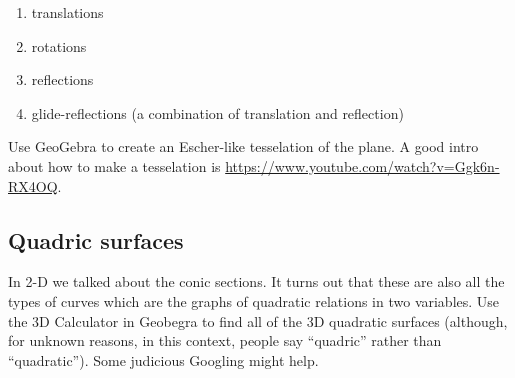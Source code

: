 \begin{enumerate} 
	\item translations
	\item rotations
	\item reflections
	\item glide-reflections (a combination of translation and reflection)
\end{enumerate}

Use GeoGebra to create an Escher-like tesselation of the plane.  A good intro about how to make a tesselation is \url{https://www.youtube.com/watch?v=Ggk6n-RX4OQ}.

\subsection{Quadric surfaces}

In 2-D we talked about the conic sections.  It turns out that these are also all the types of curves which are the graphs of quadratic relations in two variables.
Use the 3D Calculator in Geobegra to find all of the 3D quadratic surfaces (although, for unknown reasons, in this context, people say ``quadric'' rather than ``quadratic'').
Some judicious Googling might help.
